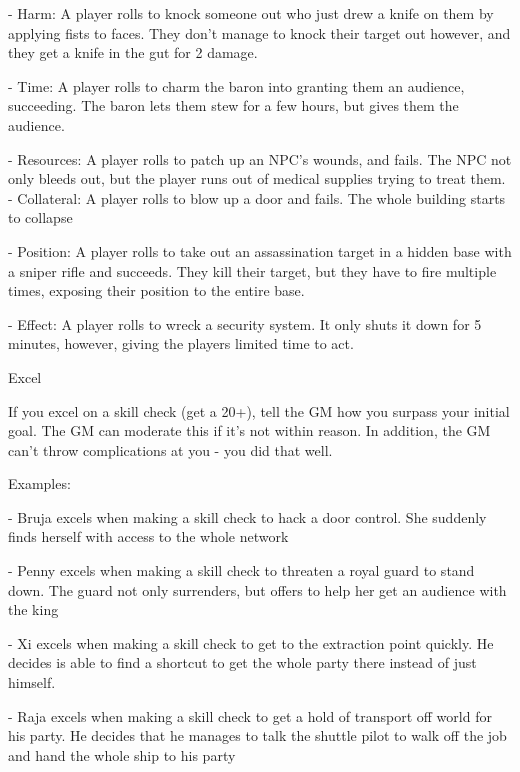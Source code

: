          	- Harm: A player rolls to knock someone out who just drew a knife on them by applying
         fists to faces. They don’t manage to knock their target out however, and they get a knife
         in the gut for 2 damage.

         - Time: A player rolls to charm the baron into granting them an audience, succeeding.
         The baron lets them stew for a few hours, but gives them the audience.

         	- Resources: A player rolls to patch up an NPC’s wounds, and fails. The NPC not only
         bleeds out, but the player runs out of medical supplies trying to treat them.
         - Collateral: A player rolls to blow up a door and fails. The whole building starts to
         collapse

         	- Position: A player rolls to take out an assassination target in a hidden base with a
         sniper rifle and succeeds. They kill their target, but they have to fire multiple times,
         exposing their position to the entire base.

         	- Effect: A player rolls to wreck a security system. It only shuts it down for 5 minutes,
         however, giving the players limited time to act.


                                                       Excel

If you excel on a skill check (get a 20+), tell the GM how you surpass your initial goal. The GM
can moderate this if it’s not within reason. In addition, the GM can’t throw complications at you -
you did that well.


Examples:

         	- Bruja excels when making a skill check to hack a door control. She suddenly finds
         herself with access to the whole network

         	- Penny excels when making a skill check to threaten a royal guard to stand down. The
         guard not only surrenders, but offers to help her get an audience with the king





         	- Xi excels when making a skill check to get to the extraction point quickly. He decides
         is able to find a shortcut to get the whole party there instead of just himself.

         - Raja excels when making a skill check to get a hold of transport off world for his party.
         He decides that he manages to talk the shuttle pilot to walk off the job and hand the
         whole ship to his party

